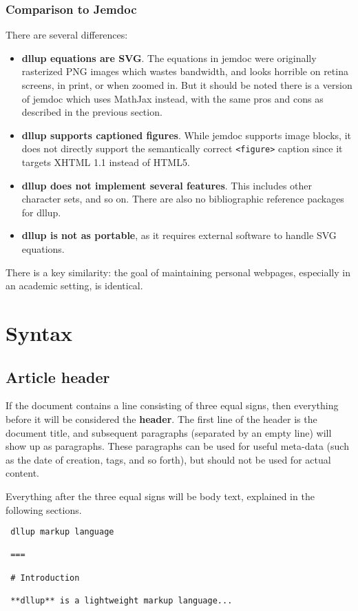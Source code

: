 \subsubsection{Comparison to Jemdoc}
\label{s1.2.2}
There are several differences:

\begin{itemize}\item \textbf{dllup equations are SVG}. The equations in jemdoc were originally rasterized PNG images which wastes bandwidth, and looks horrible on retina screens, in print, or when zoomed in. But it should be noted there is a version of jemdoc which uses MathJax instead, with the same pros and cons as described in the previous section.
\item \textbf{dllup supports captioned figures}. While jemdoc supports image blocks, it does not directly support the semantically correct \texttt{<figure>} caption since it targets XHTML 1.1 instead of HTML5.
\item \textbf{dllup does not implement several features}. This includes other character sets, and so on. There are also no bibliographic reference packages for dllup.
\item \textbf{dllup is not as portable}, as it requires external software to handle SVG equations.
\end{itemize}
There is a key similarity: the goal of maintaining personal webpages, especially in an academic setting, is identical.

\section{Syntax}
\label{s2}
\subsection{Article header}
\label{s2.1}
If the document contains a line consisting of three equal signs, then everything before it will be considered the \textbf{header}. The first line of the header is the document title, and subsequent paragraphs (separated by an empty line) will show up as paragraphs. These paragraphs can be used for useful meta-data (such as the date of creation, tags, and so forth), but should not be used for actual content.

Everything after the three equal signs will be body text, explained in the following sections.

\begin{lstlisting}
 dllup markup language

 ===

 # Introduction
 
 **dllup** is a lightweight markup language...
\end{lstlisting}
